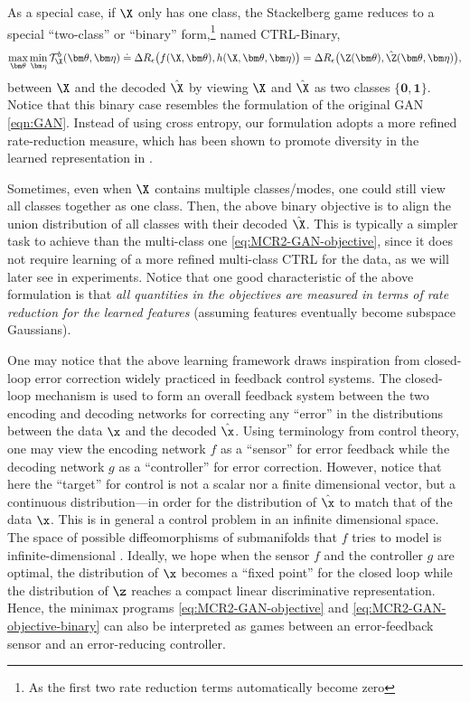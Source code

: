 \documentclass[../../book-main.tex]{subfiles}
\begin{document}
As a special case, if $\X$ only has one class, the Stackelberg game reduces to a special ``two-class'' or ``binary'' form,\footnote{As the first two rate reduction terms automatically become zero} named CTRL-Binary, 
\begin{equation}
 \max_{\bm \theta} \min_{\bm \eta} \mathcal{T}^b_{\X}(\bm \theta, \bm \eta) \doteq \Delta R_\epsilon\big(f(\X,\bm \theta), h(\X,\bm \theta,\bm \eta)\big) = \Delta R_\epsilon\big(\Z(\bm \theta), \hat \Z(\bm \theta, \bm \eta)\big), 
    \label{eq:MCR2-GAN-objective-binary}
\end{equation}
between $\X$ and the decoded $\hat\X$ by viewing $\X$ and $\hat \X$ as two classes $\{\bm 0, \bm 1\}$. Notice that this binary case resembles the formulation of the original GAN \eqref{eqn:GAN}. Instead of using cross entropy, our formulation adopts a more refined rate-reduction measure, which has been shown to promote diversity in the learned representation in . %

Sometimes, even when $\X$ contains multiple classes/modes, one could still view all classes together as one class. Then, the above binary objective is to align the union distribution of all classes with their decoded $\hat \X$. This is typically a simpler task to achieve than the multi-class one \eqref{eq:MCR2-GAN-objective}, since it does not require learning of a more refined multi-class CTRL for the data, as we will later see in experiments. Notice that one good characteristic of the above formulation is that {\em all quantities in the objectives are measured in terms of rate reduction for the learned features} (assuming features eventually become subspace Gaussians). 

One may notice that the above learning framework draws inspiration from closed-loop error correction widely practiced in feedback control systems. The closed-loop mechanism is used to form an overall feedback system between the two encoding and decoding networks for correcting any  ``error'' in the distributions between the data $\x$ and the decoded $\hat \x$. Using terminology from control theory, one may view the encoding network $f$ as a ``sensor'' for error feedback while the decoding network $g$ as a ``controller'' for error correction. However, notice that here the ``target'' for control is not a scalar nor a finite dimensional vector, but a continuous distribution---in order for the distribution of $\hat \x$ to match that of the data $\x$. This is in general a control problem in an infinite dimensional space. The space of possible diffeomorphisms of submanifolds that $f$ tries to model is infinite-dimensional \cite{Lee2002IntroductionTS}. Ideally, we hope when the sensor $f$ and the controller $g$ are optimal, the distribution of $\x$ becomes a ``fixed point'' for the closed loop while the distribution of $\z$ reaches a compact linear discriminative representation. Hence, the minimax programs \eqref{eq:MCR2-GAN-objective} and \eqref{eq:MCR2-GAN-objective-binary} can also be interpreted as games between an error-feedback sensor and an error-reducing controller.
\end{document}
